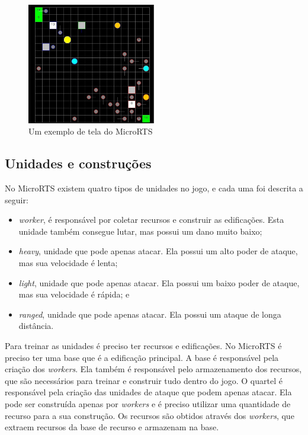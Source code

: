 \begin{figure}[ht]
	\centering
	\includegraphics[width=0.5\textwidth]{fig/microrts.pdf}
	\caption{Um exemplo de tela do MicroRTS}
	\label{fig:microrts}
\end{figure} 

\subsection{Unidades e construções}
No MicroRTS existem quatro tipos de unidades no jogo, e cada uma foi descrita a seguir:

\begin{itemize}
	\item \textit{worker}, é responsável por coletar recursos e construir as edificações. Esta unidade também consegue lutar, mas possui um dano muito baixo;
	\item \textit{heavy}, unidade que pode apenas atacar. Ela possui um alto poder de ataque, mas sua velocidade é lenta;
	\item \textit{light}, unidade que pode apenas atacar. Ela possui um baixo poder de ataque, mas sua velocidade é rápida; e
	\item \textit{ranged}, unidade que pode apenas atacar. Ela possui um ataque de longa distância. 
\end{itemize} 

Para treinar as unidades é preciso ter recursos e edificações. 
No MicroRTS é preciso ter uma base que é a edificação principal. 
A base é responsável pela criação dos \textit{workers}.
Ela também é responsável pelo armazenamento dos recursos, que são necessários para treinar e construir tudo dentro do jogo. 
O quartel é responsável pela criação das unidades de ataque que podem apenas atacar. 
Ela pode ser construída apenas por \textit{workers} e é preciso utilizar uma quantidade de recurso para a sua construção. 
Os recursos são obtidos através dos \textit{workers}, que extraem recursos da base de recurso e armazenam na base. 

